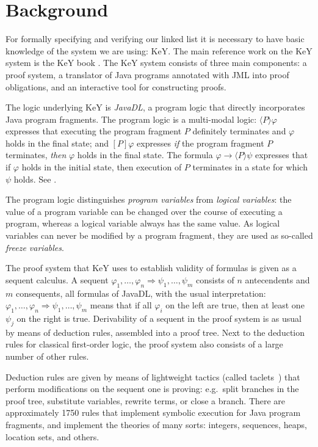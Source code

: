 \section{Background}\label{sec:background}

For formally specifying and verifying our linked list it is necessary to have basic knowledge of the system we are using: KeY. The main reference work on the KeY system is the KeY book \cite{KeYbook}. The KeY system consists of three main components: a proof system, a translator of Java programs annotated with JML into proof obligations, and an interactive tool for constructing proofs.

The logic underlying KeY is \emph{JavaDL}, a program logic that directly incorporates Java program fragments.
The program logic is a multi-modal logic: $\langle P\rangle\varphi$ expresses that executing the program fragment $P$ definitely terminates and $\varphi$ holds in the final state; and $[P]\varphi$ expresses \emph{if} the program fragment $P$ terminates, \emph{then} $\varphi$ holds in the final state. The formula $\varphi\to\langle P\rangle\psi$ expresses that if $\varphi$ holds in the initial state, then execution of $P$ terminates in a state for which $\psi$ holds.  See \cite[Chapter 3]{KeYbook}.

The program logic distinguishes \emph{program variables} from \emph{logical variables}: the value of a program variable can be changed over the course of executing a program, whereas a logical variable always has the same value. As logical variables can never be modified by a program fragment, they are used as so-called \emph{freeze variables}.

The proof system that KeY uses to establish validity of formulas is given as a sequent calculus. A sequent $\varphi_1,\ldots,\varphi_n \Rightarrow \psi_1,\ldots,\psi_m$ consists of $n$ antecendents and $m$ consequents, all formulas of JavaDL, with the usual interpretation: $\varphi_1,\ldots,\varphi_n \Rightarrow \psi_1,\ldots,\psi_m$ means that if all $\varphi_i$ on the left are true, then at least one $\psi_j$ on the right is true. Derivability of a sequent in the proof system is as usual by means of deduction rules, assembled into a proof tree. Next to the deduction rules for classical first-order logic, the proof system also consists of a large number of other rules.

Deduction rules are given by means of lightweight tactics (called taclets~\cite{beckert2004taclets}) that perform modifications on the sequent one is proving: e.g.~split branches in the proof tree, substitute variables, rewrite terms, or close a branch. There are approximately 1750 rules that implement symbolic execution for Java program fragments, and implement the theories of many sorts: integers, sequences, heaps, location sets, and others.

